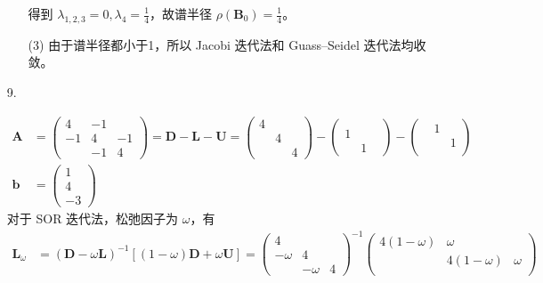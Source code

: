 \documentclass{sjtuarticle}
\begin{document}
\begin{itemize}
\begin{solution}
\begin{itemize}
\begin{equation*}
            \end{equation*}
            得到 $\lambda_{1,2,3}=0,\lambda_4=\frac14$，故谱半径 $\rho(\bm{B}_0)=\frac14$。
            \item[(3)] 由于谱半径都小于1，所以 Jacobi 迭代法和 Guass--Seidel 迭代法均收敛。
        \end{itemize}
    \end{solution}
    \item[9.] \begin{solution}
        \begin{align*}
            \bm{A}&=\begin{pmatrix}
                4 & -1 & \\
                -1 & 4 & -1 \\
                   & -1 & 4
            \end{pmatrix}=\bm{D}-\bm{L}-\bm{U}=\begin{pmatrix}
                4\\ & 4 \\ & & 4
            \end{pmatrix}-\begin{pmatrix}
                \\ 1 \\ & 1 & 
            \end{pmatrix}-\begin{pmatrix}
                & 1 & \\ & & 1 \\ & & 
            \end{pmatrix} \\
            \bm{b}&=\begin{pmatrix}
                1\\4\\-3
            \end{pmatrix}
        \end{align*}
        对于 SOR 迭代法，松弛因子为 $\omega$，有
        \begin{align*}
            \bm{L}_\omega &= (\bm{D}-\omega\bm{L})^{-1}[(1-\omega)\bm{D}+\omega\bm{U}]=\begin{pmatrix}
                4 \\ -\omega & 4 \\ & -\omega & 4
            \end{pmatrix}^{-1}\begin{pmatrix}
                4(1-\omega) & \omega \\
                & 4(1-\omega) & \omega \\

\end{pmatrix}
\end{align*}
\end{solution}
\end{itemize}
\end{document}
